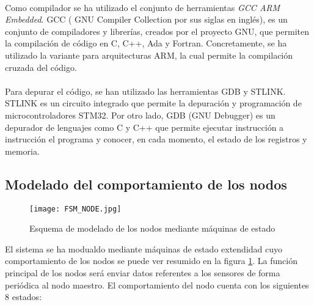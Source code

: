 	\paragraph{}
	Como compilador se ha utilizado el conjunto de herramientas \textit{GCC ARM Embedded}. GCC ( GNU Compiler Collection por sus siglas en inglés), es un conjunto de compiladores y librerías, creados por el proyecto GNU, que permiten la compilación de código en C, C++, Ada y Fortran. Concretamente, se ha utilizado la variante para arquitecturas ARM, la cual permite la compilación cruzada del código.
	\paragraph{}
	Para depurar el código, se han utilizado las herramientas GDB y STLINK. STLINK es un circuito integrado que permite la depuración y programación de microcontroladores STM32. Por otro lado, GDB (GNU Debugger) es un depurador de lenguajes como C y C++ que permite ejecutar instrucción a instrucción el programa y conocer, en cada momento, el estado de los registros y memoria. 
	
				
	\subsection{Modelado del comportamiento de los nodos} \label{NodeFSM}
	
	\begin{figure}[!h]
		\centering
		\texttt{[image: FSM\_NODE.jpg]}
		\caption{Esquema de modelado de los nodos mediante máquinas de estado}
		\label{fig:nodeFSM}
	\end{figure}
	
	El sistema se ha modualdo mediante máquinas de estado extendidad cuyo comportamiento de los nodos se puede ver resumido en la figura \ref{fig:nodeFSM}. La función principal de los nodos será enviar datos referentes a los sensores de forma periódica al nodo maestro. 
	El comportamiento del nodo cuenta con los siguientes 8 estados:
	
